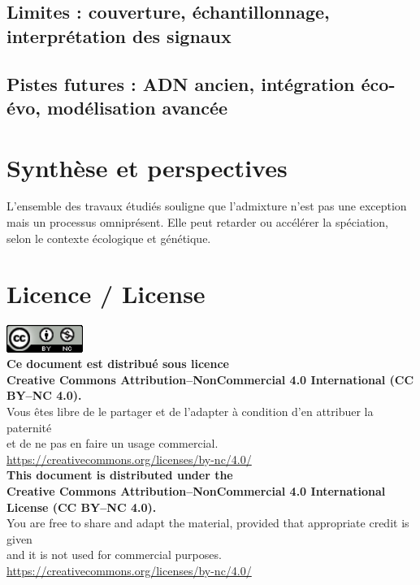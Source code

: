 \documentclass[12pt,a4paper]{article}
\begin{document}
\subsection{Limites : couverture, échantillonnage, interprétation des signaux}
\subsection{Pistes futures : ADN ancien, intégration éco-évo, modélisation avancée}

\section{Synthèse et perspectives}
L’ensemble des travaux étudiés souligne que l’admixture n’est pas une exception mais un processus omniprésent.
Elle peut retarder ou accélérer la spéciation, selon le contexte écologique et génétique.

\printbibliography

\section*{Licence / License}
\begin{center}
    \includegraphics[width=2.5cm]{figures/cc-by-nc.png}\\[0.5em]
    \textbf{Ce document est distribué sous licence\\
        Creative Commons Attribution–NonCommercial 4.0 International (CC BY–NC 4.0).}\\[0.5em]
    Vous êtes libre de le partager et de l’adapter à condition d’en attribuer la paternité\\
    et de ne pas en faire un usage commercial.\\[0.3em]
    \url{https://creativecommons.org/licenses/by-nc/4.0/}\\[1em]
    \textbf{This document is distributed under the\\
        Creative Commons Attribution–NonCommercial 4.0 International License (CC BY–NC 4.0).}\\[0.5em]
    You are free to share and adapt the material, provided that appropriate credit is given\\
    and it is not used for commercial purposes.\\[0.3em]
    \url{https://creativecommons.org/licenses/by-nc/4.0/}
\end{center}
\end{document}

